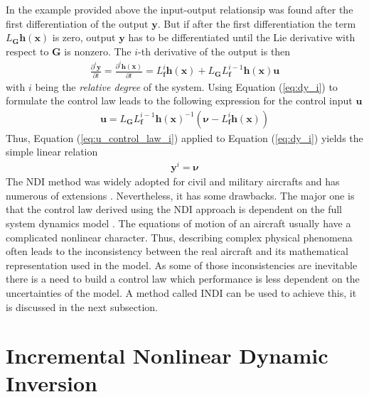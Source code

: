 \documentclass[11pt, a4paper, twoside]{report}
\begin{document}
In the example provided above the input-output relationsip was found after the first differentiation of the output $\bm{y}$. But if after the first differentiation the term $L_{\bm{G}}\bm{h}(\bm{x})$ is zero, output $\bm{y}$ has to be differentiated until the Lie derivative with respect to $\bm{G}$ is nonzero. The $i$-th derivative of the output is then
\begin{equation}
	\begin{split}
		\frac{\partial^i\bm{y}}{\partial t} = \frac{\partial^i\bm{h}(\bm{x})}{\partial t} = L_{\bm{f}}^i \bm{h}(\bm{x}) + L_{\bm{G}} L_{\bm{f}}^{i-1} \bm{h}(\bm{x}) \bm{u}
		\label{eq:dy_i}
	\end{split}
\end{equation}
with $i$ being the \textit{relative degree} of the system. Using Equation (\ref{eq:dy_i}) to formulate the control law leads to the following expression for the control input $\bm{u}$
\begin{equation}
	\begin{split}
		\bm{u} = L_{\bm{G}} L_{\bm{f}}^{i-1} \bm{h}(\bm{x})^{-1} (\bm{\nu} - L_{\bm{f}}^i\bm{h}(\bm{x})) 
		\label{eq:u_control_law_i}
	\end{split}
\end{equation}
Thus, Equation (\ref{eq:u_control_law_i}) applied to Equation (\ref{eq:dy_i}) yields the simple linear relation
\begin{equation}
	\begin{split}
		\bm{y}^i = \bm{\nu}
		\label{eq:lin_relation}
	\end{split}
\end{equation}
The \acrshort{NDI} method was widely adopted for civil and military aircrafts and has numerous of extensions \cite{Horn}. Nevertheless, it has some drawbacks. The major one is that the control law derived using the \acrshort{NDI} approach is dependent on the full system dynamics model \cite{Sieberling}. The equations of motion of an aircraft usually have a complicated nonlinear character. Thus, describing complex physical phenomena often leads to the inconsistency between the real aircraft and its mathematical representation used in the model. As some of those inconsistencies are inevitable there is a need to build a control law which performance is less dependent on the uncertainties of the model. A method called \acrfull{INDI} can be used to achieve this, it is discussed in the next subsection.

\section{Incremental Nonlinear Dynamic Inversion} \label{sec:indi}
\end{document}
